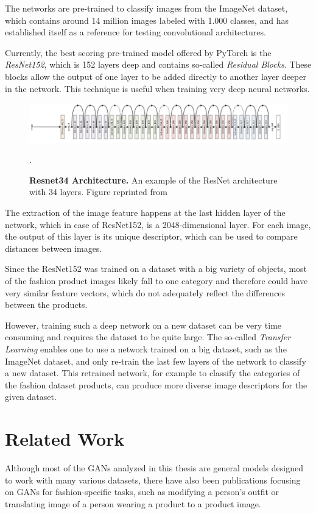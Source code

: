 \documentclass[12pt]{report}
\begin{document}
The networks are pre-trained to classify images from the ImageNet dataset, which contains around 14 million images labeled with 1.000 classes, and has established itself as a reference for testing convolutional architectures. 

Currently, the best scoring pre-trained model offered by PyTorch is the \textit{ResNet152}, which is 152 layers deep and contains so-called \textit{Residual Blocks}. These blocks allow the output of one layer to be added directly to another layer deeper in the network. This technique is useful when training very deep neural networks.

\begin{figure}[h]
\centering
{\includegraphics[width=\linewidth]{02_background/CBIR/resnet_arch}}
\caption{\label{fig:resnet34} \textbf{Resnet34 Architecture.} An example of the ResNet architecture with 34 layers. Figure reprinted from \cite{noauthor_resnet-152_nodate}}.
\end{figure}

The extraction of the image feature happens at the last hidden layer of the network, which in case of ResNet152, is a 2048-dimensional layer. For each image, the output of this layer is its unique descriptor, which can be used to compare distances between images.

Since the ResNet152 was trained on a dataset with a big variety of objects, most of the fashion product images likely fall to one category and therefore could have very similar feature vectors, which do not adequately reflect the differences between the products.

However, training such a deep network on a new dataset can be very time consuming and requires the dataset to be quite large. The so-called \textit{Transfer Learning} enables one to use a network trained on a big dataset, such as the ImageNet dataset, and only re-train the last few layers of the network to classify a new dataset. This retrained network, for example to classify the categories of the fashion dataset products, can produce more diverse image descriptors for the given dataset.

\pagebreak
\section{Related Work} \label{sec:related}
Although most of the GANs analyzed in this thesis are general models designed to work with many various datasets, there have also been publications focusing on GANs for fashion-specific tasks, such as modifying a person's outfit or translating image of a person wearing a product to a product image.
\end{document}
